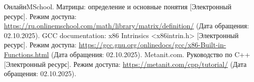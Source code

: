 \begin{thebibliography}{}
	 ОнлайнMSchool. Матрицы: определение и основные понятия [Электронный ресурс]. Режим доступа: \url{https://ru.onlinemschool.com/math/library/matrix/definition/} (Дата обращения: 02.10.2025).
	 GCC documentation: x86 Intrinsics <x86intrin.h> [Электронный ресурс]. Режим доступа: \url{https://gcc.gnu.org/onlinedocs/gcc/x86-Built-in-Functions.html} (Дата обращения: 02.10.2025).
	 Metanit.com. Руководство по C++ [Электронный ресурс]. Режим доступа: \url{https://metanit.com/cpp/tutorial/} (Дата обращения: 02.10.2025).
\end{thebibliography}

